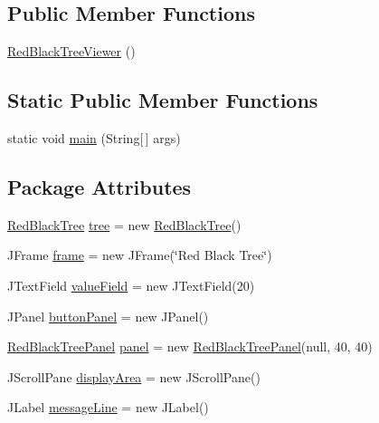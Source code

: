 \subsection*{Public Member Functions}
\begin{DoxyCompactItemize}
\item 
\hyperlink{class_red_black_tree_viewer_a79b2a54568d48e698aa0739bff50753d}{Red\+Black\+Tree\+Viewer} ()
\end{DoxyCompactItemize}
\subsection*{Static Public Member Functions}
\begin{DoxyCompactItemize}
\item 
static void \hyperlink{class_red_black_tree_viewer_a76895bc3f20c12a7c26f719d4eeaf692}{main} (String\mbox{[}$\,$\mbox{]} args)
\end{DoxyCompactItemize}
\subsection*{Package Attributes}
\begin{DoxyCompactItemize}
\item 
\hyperlink{class_red_black_tree}{Red\+Black\+Tree} \hyperlink{class_red_black_tree_viewer_a806efbd070af5c862352e9c98b1d4ccf}{tree} = new \hyperlink{class_red_black_tree}{Red\+Black\+Tree}()
\item 
J\+Frame \hyperlink{class_red_black_tree_viewer_a63b608eef30c345e86fbf565296da751}{frame} = new J\+Frame(\char`\"{}Red Black Tree\char`\"{})
\item 
J\+Text\+Field \hyperlink{class_red_black_tree_viewer_a1c5fcda6f8f3b95dba8d1507d6b76afc}{value\+Field} = new J\+Text\+Field(20)
\item 
J\+Panel \hyperlink{class_red_black_tree_viewer_ae4a99fc6ea87e0a02d1d92c1b95ff6fb}{button\+Panel} = new J\+Panel()
\item 
\hyperlink{class_red_black_tree_panel}{Red\+Black\+Tree\+Panel} \hyperlink{class_red_black_tree_viewer_a5ca3120cf31ee3d78f016637dcdeb41e}{panel} = new \hyperlink{class_red_black_tree_panel}{Red\+Black\+Tree\+Panel}(null, 40, 40)
\item 
J\+Scroll\+Pane \hyperlink{class_red_black_tree_viewer_a29e143bcfef5a1feb59fdc7bc85e4ca0}{display\+Area} = new J\+Scroll\+Pane()
\item 
J\+Label \hyperlink{class_red_black_tree_viewer_accf947ca330f1d4dd258e233ea275d58}{message\+Line} = new J\+Label()
\end{DoxyCompactItemize}


